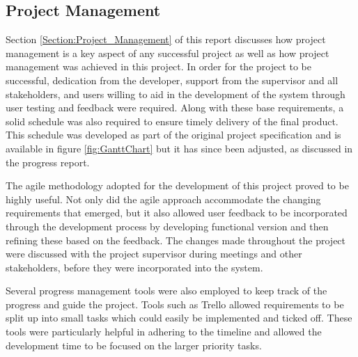 \subsection{Project Management}
Section \ref{Section:Project_Management} of this report discusses how project management is a key aspect of any successful project as well as how project management was achieved in this project. In order for the project to be successful, dedication from the developer, support from the supervisor and all stakeholders, and users willing to aid in the development of the system through user testing and feedback were required. Along with these base requirements, a solid schedule was also required to ensure timely delivery of the final product. This schedule was developed as part of the original project specification and is available in figure \ref{fig:GanttChart} but it has since been adjusted, as discussed in the progress report.

The agile methodology adopted for the development of this project proved to be highly useful. Not only did the agile approach accommodate the changing requirements that emerged, but it also allowed user feedback to be incorporated through the development process by developing functional version and then refining these based on the feedback. The changes made throughout the project were discussed with the project supervisor during meetings and other stakeholders, before they were incorporated into the system.

Several progress management tools were also employed to keep track of the progress and guide the project. Tools such as Trello allowed requirements to be split up into small tasks which could easily be implemented and ticked off. These tools were particularly helpful in adhering to the timeline and allowed the development time to be focused on the larger priority tasks.

\newpage